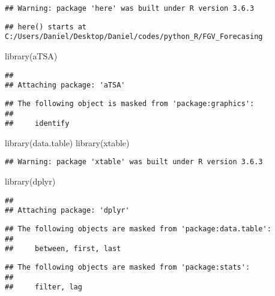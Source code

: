 \documentclass[]{article}
\newenvironment{Shaded}{\begin{snugshade}}{\end{snugshade}}
\newcommand{\FunctionTok}[1]{\textcolor[rgb]{0.00,0.00,0.00}{#1}}
\newcommand{\NormalTok}[1]{#1}
\begin{document}
\begin{verbatim}
## Warning: package 'here' was built under R version 3.6.3
\end{verbatim}

\begin{verbatim}
## here() starts at C:/Users/Daniel/Desktop/Daniel/codes/python_R/FGV_Forecasing
\end{verbatim}

\begin{Shaded}
\begin{Highlighting}[]
\FunctionTok{library}\NormalTok{(aTSA)}
\end{Highlighting}
\end{Shaded}

\begin{verbatim}
## 
## Attaching package: 'aTSA'
\end{verbatim}

\begin{verbatim}
## The following object is masked from 'package:graphics':
## 
##     identify
\end{verbatim}

\begin{Shaded}
\begin{Highlighting}[]
\FunctionTok{library}\NormalTok{(data.table)}
\FunctionTok{library}\NormalTok{(xtable)}
\end{Highlighting}
\end{Shaded}

\begin{verbatim}
## Warning: package 'xtable' was built under R version 3.6.3
\end{verbatim}

\begin{Shaded}
\begin{Highlighting}[]
\FunctionTok{library}\NormalTok{(dplyr)}
\end{Highlighting}
\end{Shaded}

\begin{verbatim}
## 
## Attaching package: 'dplyr'
\end{verbatim}

\begin{verbatim}
## The following objects are masked from 'package:data.table':
## 
##     between, first, last
\end{verbatim}

\begin{verbatim}
## The following objects are masked from 'package:stats':
## 
##     filter, lag
\end{verbatim}
\end{document}
